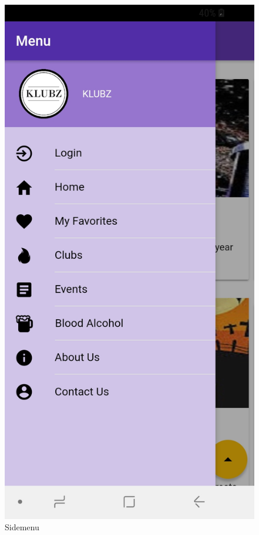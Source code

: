 \documentclass[12pt]{article}
\begin{document}
\begin{figure}[H]
  \includegraphics[width=\linewidth]{figures/Menu.jpg}
  \caption{Sidemenu}\label{fig:awesome_image6}
\endminipage
\end{figure}
\end{document}
